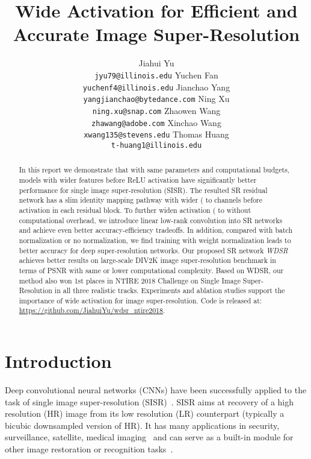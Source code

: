 \documentclass{article}
\title{Wide Activation for Efficient and Accurate Image Super-Resolution}
\author{
  Jiahui Yu\\
  \texttt{jyu79@illinois.edu}
  \And
  Yuchen Fan\\
  \texttt{yuchenf4@illinois.edu}
  \And
  Jianchao Yang\\
  \texttt{yangjianchao@bytedance.com}
  \And
  Ning Xu\\
  \texttt{ning.xu@snap.com}
  \And
  Zhaowen Wang\\
  \texttt{zhawang@adobe.com}
  \And
  Xinchao Wang\\
  \texttt{xwang135@stevens.edu}
  \And
  Thomas Huang\\
  \texttt{t-huang1@illinois.edu}
}
\begin{document}
\maketitle
\begin{abstract}
In this report we demonstrate that with same parameters and computational budgets, models with wider features before ReLU activation have significantly better performance for single image super-resolution (SISR). The resulted SR residual network has a slim identity mapping pathway with wider ( to  channels before activation in each residual block. To further widen activation ( to  without computational overhead, we introduce linear low-rank convolution into SR networks and achieve even better accuracy-efficiency tradeoffs. In addition, compared with batch normalization or no normalization, we find training with weight normalization leads to better accuracy for deep super-resolution networks. Our proposed SR network \textit{WDSR} achieves better results on large-scale DIV2K image super-resolution benchmark in terms of PSNR with same or lower computational complexity. Based on WDSR, our method also won 1st places in NTIRE 2018 Challenge on Single Image Super-Resolution in all three realistic tracks. Experiments and ablation studies support the importance of wide activation for image super-resolution. Code is released at: \url{https://github.com/JiahuiYu/wdsr_ntire2018}.
\end{abstract}

\section{Introduction}

Deep convolutional neural networks (CNNs) have been successfully applied to the task of single image super-resolution (SISR)~\cite{kim2016accurate, lim2017enhanced, liu2016robust, 2018arXiv180208797Z}. SISR aims at recovery of a high resolution (HR) image from its low resolution (LR) counterpart (typically a bicubic downsampled version of HR). It has many applications in security, surveillance, satellite, medical imaging~\cite{peled2001superresolution, thornton2006sub} and can serve as a built-in module for other image restoration or recognition tasks~\cite{fan2018wide, liu2017robust, wang2016studying, yu2018free, yu2018generative}.
 
\end{document}
